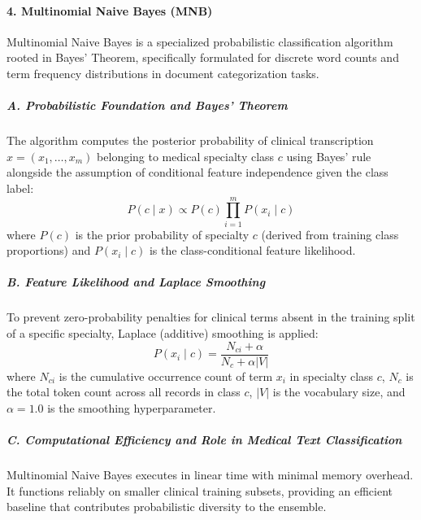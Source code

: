 \paragraph{4. Multinomial Naive Bayes (MNB)}

Multinomial Naive Bayes is a specialized probabilistic classification algorithm rooted in Bayes' Theorem, specifically formulated for discrete word counts and term frequency distributions in document categorization tasks.

\subparagraph{A. Probabilistic Foundation and Bayes' Theorem}
The algorithm computes the posterior probability of clinical transcription $x = (x_1, \dots, x_m)$ belonging to medical specialty class $c$ using Bayes' rule alongside the assumption of conditional feature independence given the class label:
\begin{equation}
P(c \mid x) \propto P(c) \prod_{i=1}^{m} P(x_i \mid c)
\end{equation}
where $P(c)$ is the prior probability of specialty $c$ (derived from training class proportions) and $P(x_i \mid c)$ is the class-conditional feature likelihood.

\subparagraph{B. Feature Likelihood and Laplace Smoothing}
To prevent zero-probability penalties for clinical terms absent in the training split of a specific specialty, Laplace (additive) smoothing is applied:
\begin{equation}
P(x_i \mid c) = \frac{N_{ci} + \alpha}{N_c + \alpha |V|}
\end{equation}
where $N_{ci}$ is the cumulative occurrence count of term $x_i$ in specialty class $c$, $N_c$ is the total token count across all records in class $c$, $|V|$ is the vocabulary size, and $\alpha = 1.0$ is the smoothing hyperparameter.

\subparagraph{C. Computational Efficiency and Role in Medical Text Classification}
Multinomial Naive Bayes executes in linear time with minimal memory overhead. It functions reliably on smaller clinical training subsets, providing an efficient baseline that contributes probabilistic diversity to the ensemble.

